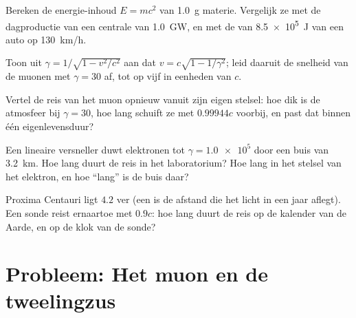 \begin{exercise}[$\star\star$]\label{exo:g12:special-relativity:11}
Bereken de energie-inhoud $E = mc^2$ van \qty{1.0}{g} materie. Vergelijk ze met
de dagproductie van een centrale van \qty{1.0}{GW}, en met de  van \qty{8.5e5}{J} van een auto op \qty{130}{km/h}.
\end{exercise}

\begin{exercise}[$\star\star\star$]\label{exo:g12:special-relativity:12}
Toon uit $\gamma = 1/\sqrt{1 - v^2/c^2}$ aan dat
$v = c\sqrt{1 - 1/\gamma^2}$; leid daaruit de snelheid van de muonen met
$\gamma = 30$ af, tot op vijf  in eenheden van $c$.
\end{exercise}

\begin{exercise}[$\star\star\star$]\label{exo:g12:special-relativity:13}
Vertel de reis van het muon opnieuw vanuit zijn eigen stelsel: hoe dik is de
atmosfeer bij $\gamma = 30$, hoe lang schuift ze met $0.99944c$ voorbij, en
past dat binnen één eigenlevensduur?
\end{exercise}

\begin{exercise}[$\star\star\star$]\label{exo:g12:special-relativity:14}
Een lineaire versneller duwt elektronen tot $\gamma = \num{1.0e5}$ door een
buis van \qty{3.2}{km}. Hoe lang duurt de reis in het laboratorium? Hoe lang in
het stelsel van het elektron, en hoe ``lang'' is de buis daar?
\end{exercise}

\begin{exercise}[$\star\star\star$]\label{exo:g12:special-relativity:15}
Proxima Centauri ligt $4.2$  ver (een  is de afstand die het
licht in een jaar aflegt). Een sonde reist ernaartoe met $0.9c$: hoe lang duurt
de reis op de kalender van de Aarde, en op de klok van de sonde?
\end{exercise}

\section{Probleem: Het muon en de tweelingzus}

